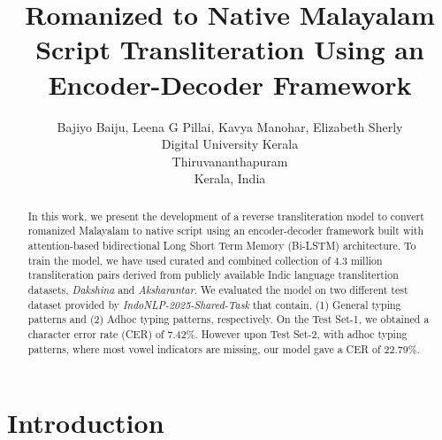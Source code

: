 \documentclass[11pt]{article}
\title{Romanized to Native Malayalam Script Transliteration Using an Encoder-Decoder Framework}
\author{Bajiyo Baiju, Leena G Pillai, Kavya Manohar, Elizabeth Sherly \\
       Digital University Kerala \\ Thiruvananthapuram \\ Kerala, India}
\begin{document}
\maketitle
\begin{abstract}
In this work, we present the development of a reverse transliteration model to convert romanized Malayalam to native script using an encoder-decoder framework built with attention-based bidirectional Long Short Term Memory (Bi-LSTM) architecture. To train the model, we have used curated and combined collection of 4.3 million transliteration pairs derived from publicly available Indic language translitertion datasets, \textit{Dakshina} and \textit{Aksharantar}. We evaluated the model on two different test dataset provided by \textit{ IndoNLP-2025-Shared-Task} that contain, (1) General typing patterns and (2) Adhoc typing patterns, respectively. On the Test Set-1, we obtained a character error rate (CER) of 7.42\%. However upon Test Set-2, with adhoc typing patterns, where most vowel indicators are missing, our model gave a CER of 22.79\%.


\end{abstract}

\section{Introduction}


\end{document}
